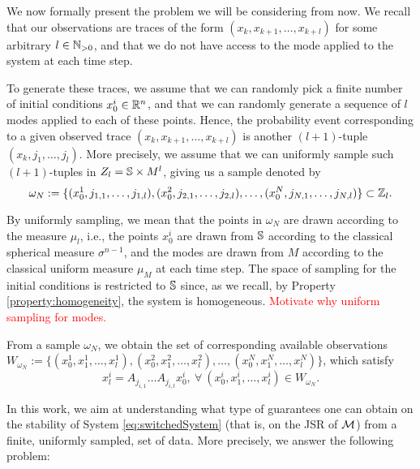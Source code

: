 We now formally present the problem we will be considering from now. We recall that our observations are traces of the form $(x_k,x_{k+1},\dots,x_{k+l})$ for some arbitrary $l \in \mathbb{N}_{>0}$, and that we do not have access to the mode applied to the system at each time step. 

To generate these traces, we assume that we can randomly pick a finite number of initial conditions $x_0^i \in \mathbb{R}^n$, and that we can randomly generate a sequence of $l$ modes applied to each of these points. Hence, the probability event corresponding to a given observed trace $(x_k,x_{k+1},\dots,x_{k+l})$ is another $(l+1)$-tuple $(x_k,j_1,\dots,j_l)$. More precisely, we assume that we can uniformly sample such $(l+1)$-tuples in $Z_l = \mathbb{S} \times M^l$, giving us a sample denoted by 
$$\omega_N := \{(x_0^1, j_{1,1}, \dots, j_{1,l}), (x_0^2, j_{2,1}, \dots, j_{2,l}), \ldots, (x_0^N, j_{N,1},\dots, j_{N,l})\} \subset \mathbb{Z}_l.$$

By uniformly sampling, we mean that the points in $\omega_N$ are drawn according to the measure $\mu_l$, i.e., the points $x_0^i$ are drawn from $\mathbb{S}$ according to the classical spherical measure $\sigma^{n-1}$, and the modes are drawn from $M$ according to the classical uniform measure $\mu_M$ at each time step. The space of sampling for the initial conditions is restricted to $\mathbb{S}$ since, as we recall, by Property \ref{property:homogeneity}, the system is homogeneous. \textcolor{red}{Motivate why uniform sampling for modes.}

From a sample $\omega_N$, we obtain the set of corresponding available observations $W_{\omega_N} := \{(x_0^1,x_1^1, \dots, x_l^1), (x_0^2,x_1^2, \dots, x_l^2), \ldots, (x_0^N,x_1^N, \dots, x_l^N)\}$, which satisfy $$x_l^i= A_{j_{i,1}} \dots A_{j_{i,l}} x_0^i, \ \forall\ (x_0^i,x_1^i,\dots, x_l^i) \in W_{\omega_N}.$$

In this work, we aim at understanding what type of guarantees one can obtain on the stability of System \eqref{eq:switchedSystem} (that is, on the JSR of $\mathcal{M}$) from a finite, uniformly sampled, set of data. More precisely, we answer the following problem:

